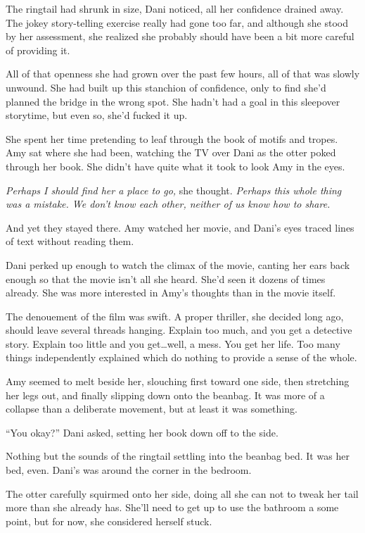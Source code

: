 The ringtail had shrunk in size, Dani noticed, all her confidence drained away. The jokey story-telling exercise really had gone too far, and although she stood by her assessment, she realized she probably should have been a bit more careful of providing it.

All of that openness she had grown over the past few hours, all of that was slowly unwound. She had built up this stanchion of confidence, only to find she'd planned the bridge in the wrong spot. She hadn't had a goal in this sleepover storytime, but even so, she'd fucked it up.

She spent her time pretending to leaf through the book of motifs and tropes. Amy sat where she had been, watching the TV over Dani as the otter poked through her book. She didn't have quite what it took to look Amy in the eyes.

\emph{Perhaps I should find her a place to go,} she thought. \emph{Perhaps this whole thing was a mistake. We don't know each other, neither of us know how to share.}

And yet they stayed there. Amy watched her movie, and Dani's eyes traced lines of text without reading them.

Dani perked up enough to watch the climax of the movie, canting her ears back enough so that the movie isn't all she heard. She'd seen it dozens of times already. She was more interested in Amy's thoughts than in the movie itself.

The denouement of the film was swift. A proper thriller, she decided long ago, should leave several threads hanging. Explain too much, and you get a detective story. Explain too little and you get\ldots{}well, a mess. You get her life. Too many things independently explained which do nothing to provide a sense of the whole.

Amy seemed to melt beside her, slouching first toward one side, then stretching her legs out, and finally slipping down onto the beanbag. It was more of a collapse than a deliberate movement, but at least it was something.

``You okay?'' Dani asked, setting her book down off to the side.

Nothing but the sounds of the ringtail settling into the beanbag bed. It was her bed, even. Dani's was around the corner in the bedroom.

The otter carefully squirmed onto her side, doing all she can not to tweak her tail more than she already has. She'll need to get up to use the bathroom a some point, but for now, she considered herself stuck.

